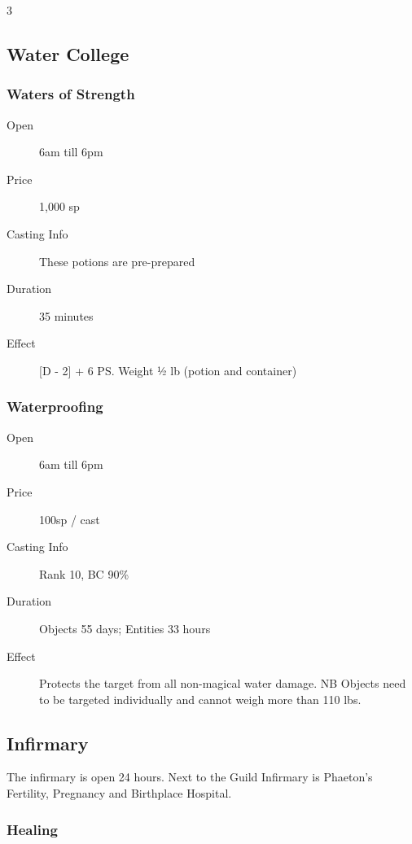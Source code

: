 \begin{multicols}{3}
\subsection{Water College}

\subsubsection{Waters of Strength}

\begin{description}
\item[Open] 6am till 6pm
\item[Price] 1,000 sp
\item[Casting Info] These potions are pre-prepared
\item[Duration] 35 minutes
\item[Effect] [D - 2] + 6 PS. Weight ½ lb (potion and
container)
\end{description}

\subsubsection{Waterproofing}

\begin{description}
\item[Open] 6am till 6pm
\item[Price] 100sp / cast
\item[Casting Info] Rank 10, BC 90\%
\item[Duration] Objects 55 days; Entities 33 hours
\item[Effect] Protects the target from all non-magical water
  damage. NB Objects need to be targeted individually and cannot weigh
  more than 110 lbs.
\end{description}

%
%

\subsection{Infirmary}

The infirmary is open 24 hours. Next to the Guild Infirmary is
Phaeton’s Fertility, Pregnancy and Birthplace Hospital.

\subsubsection{Healing}


\end{multicols}
